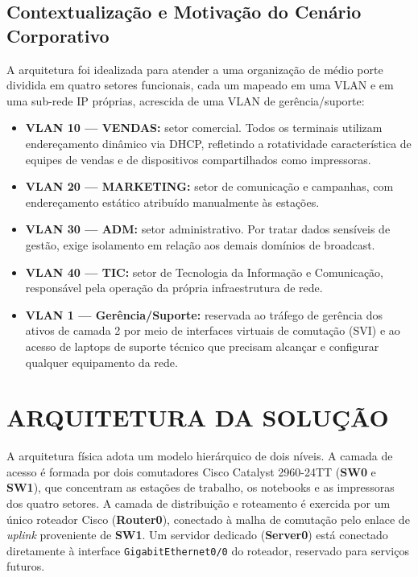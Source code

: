 \documentclass[12pt,a4paper]{article}
\begin{document}
\subsection{Contextualização e Motivação do Cenário Corporativo}

A arquitetura foi idealizada para atender a uma organização de médio porte dividida
em quatro setores funcionais, cada um mapeado em uma VLAN e em uma sub-rede IP
próprias, acrescida de uma VLAN de gerência/suporte:

\begin{itemize}[leftmargin=2em]
  \item \textbf{VLAN 10 --- VENDAS:} setor comercial. Todos os terminais utilizam
        endereçamento dinâmico via DHCP, refletindo a rotatividade característica
        de equipes de vendas e de dispositivos compartilhados como impressoras.

  \item \textbf{VLAN 20 --- MARKETING:} setor de comunicação e campanhas, com
        endereçamento estático atribuído manualmente às estações.

  \item \textbf{VLAN 30 --- ADM:} setor administrativo. Por tratar dados sensíveis
        de gestão, exige isolamento em relação aos demais domínios de broadcast.

  \item \textbf{VLAN 40 --- TIC:} setor de Tecnologia da Informação e Comunicação,
        responsável pela operação da própria infraestrutura de rede.

  \item \textbf{VLAN 1 --- Gerência/Suporte:} reservada ao tráfego de gerência dos
        ativos de camada 2 por meio de interfaces virtuais de comutação (SVI) e ao
        acesso de laptops de suporte técnico que precisam alcançar e configurar
        qualquer equipamento da rede.
\end{itemize}

\section{ARQUITETURA DA SOLUÇÃO}

A arquitetura física adota um modelo hierárquico de dois níveis. A camada de acesso é
formada por dois comutadores Cisco Catalyst 2960-24TT (\textbf{SW0} e \textbf{SW1}),
que concentram as estações de trabalho, os notebooks e as impressoras dos quatro
setores. A camada de distribuição e roteamento é exercida por um único roteador Cisco
(\textbf{Router0}), conectado à malha de comutação pelo enlace de \textit{uplink}
proveniente de \textbf{SW1}. Um servidor dedicado (\textbf{Server0}) está conectado
diretamente à interface \texttt{GigabitEthernet0/0} do roteador, reservado para
serviços futuros.
\end{document}
